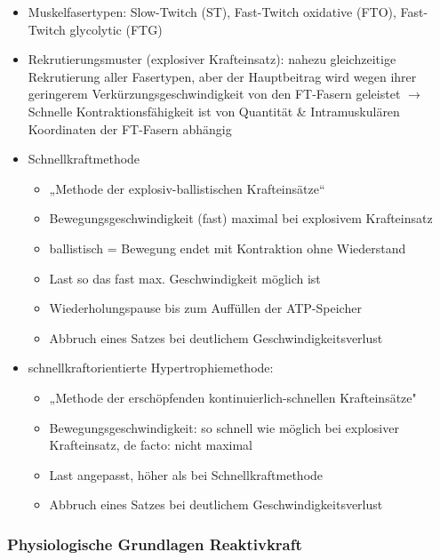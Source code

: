 \begin{minipage}{0.7\textwidth}
    \begin{itemize}
        \item Muskelfasertypen: Slow-Twitch (ST), Fast-Twitch oxidative (FTO), Fast-Twitch glycolytic (FTG)
        \item Rekrutierungsmuster (explosiver Krafteinsatz): nahezu gleichzeitige Rekrutierung aller Fasertypen, aber der Hauptbeitrag wird wegen ihrer geringerem Verkürzungsgeschwindigkeit von den FT-Fasern geleistet $\rightarrow$ Schnelle Kontraktionsfähigkeit ist von Quantität \& Intramuskulären Koordinaten der FT-Fasern abhängig
        \item Schnellkraftmethode
        \begin{itemize}
            \item „Methode der explosiv-ballistischen Krafteinsätze“
            \item Bewegungsgeschwindigkeit (fast) maximal bei explosivem Krafteinsatz
            \item ballistisch = Bewegung endet mit Kontraktion ohne Wiederstand
            \item Last so das fast max. Geschwindigkeit möglich ist
            \item Wiederholungspause bis zum Auffüllen der ATP-Speicher
            \item Abbruch eines Satzes bei deutlichem Geschwindigkeitsverlust
        \end{itemize}
        \item schnellkraftorientierte Hypertrophiemethode:
        \begin{itemize}
            \item „Methode der erschöpfenden kontinuierlich-schnellen Krafteinsätze"
            \item Bewegungsgeschwindigkeit: so schnell wie möglich bei explosiver Krafteinsatz, de facto: nicht maximal
            \item Last angepasst, höher als bei Schnellkraftmethode
            \item Abbruch eines Satzes bei deutlichem Geschwindigkeitsverlust
        \end{itemize}
    \end{itemize}
\end{minipage}

\subsubsection*{Physiologische Grundlagen Reaktivkraft}

